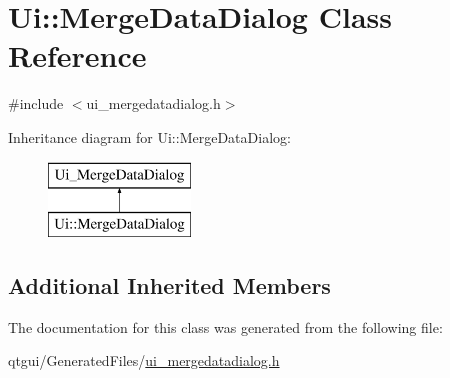 \hypertarget{class_ui_1_1_merge_data_dialog}{}\section{Ui\+::Merge\+Data\+Dialog Class Reference}
\label{class_ui_1_1_merge_data_dialog}


{\ttfamily \#include $<$ui\+\_\+mergedatadialog.\+h$>$}

Inheritance diagram for Ui\+::Merge\+Data\+Dialog\+:\begin{figure}[H]
\begin{center}
\leavevmode
\includegraphics[height=2.000000cm]{d6/d9b/class_ui_1_1_merge_data_dialog}
\end{center}
\end{figure}
\subsection*{Additional Inherited Members}


The documentation for this class was generated from the following file\+:\begin{DoxyCompactItemize}
\item 
qtgui/\+Generated\+Files/\mbox{\hyperlink{ui__mergedatadialog_8h}{ui\+\_\+mergedatadialog.\+h}}\end{DoxyCompactItemize}
